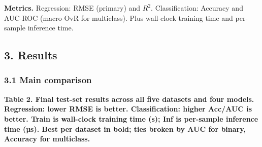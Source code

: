 \documentclass[
  11pt,
  onecolumn]{article}
\begin{document}
\textbf{Metrics.} Regression: RMSE (primary) and \(R^2\).
Classification: Accuracy and AUC-ROC (macro-OvR for multiclass). Plus
wall-clock training time and per-sample inference time.

\subsection{3. Results}\label{results}

\subsubsection{3.1 Main comparison}\label{main-comparison}

\textbf{Table 2. Final test-set results across all five datasets and
four models. Regression: lower RMSE is better. Classification: higher
Acc/AUC is better. Train is wall-clock training time (s); Inf is
per-sample inference time (µs). Best per dataset in bold; ties broken by
AUC for binary, Accuracy for multiclass.}

\begingroup\footnotesize
\end{document}
